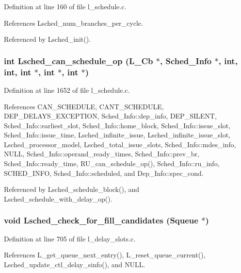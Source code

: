 Definition at line 160 of file l\_\-schedule.c.

References Lsched\_\-num\_\-branches\_\-per\_\-cycle.

Referenced by Lsched\_\-init().
\subsubsection{\setlength{\rightskip}{0pt plus 5cm}int Lsched\_\-can\_\-schedule\_\-op (L\_\-Cb $\ast$, \bf{Sched\_\-Info} $\ast$, int, int, int $\ast$, int $\ast$, int $\ast$)}\label{l__schedule_8h_96359c2354c002d34b4f5804322979dd}




Definition at line 1652 of file l\_\-schedule.c.

References CAN\_\-SCHEDULE, CANT\_\-SCHEDULE, DEP\_\-DELAYS\_\-EXCEPTION, Sched\_\-Info::dep\_\-info, DEP\_\-SILENT, Sched\_\-Info::earliest\_\-slot, Sched\_\-Info::home\_\-block, Sched\_\-Info::issue\_\-slot, Sched\_\-Info::issue\_\-time, Lsched\_\-infinite\_\-issue, Lsched\_\-infinite\_\-issue\_\-slot, Lsched\_\-processor\_\-model, Lsched\_\-total\_\-issue\_\-slots, Sched\_\-Info::mdes\_\-info, NULL, Sched\_\-Info::operand\_\-ready\_\-times, Sched\_\-Info::prev\_\-br, Sched\_\-Info::ready\_\-time, RU\_\-can\_\-schedule\_\-op(), Sched\_\-Info::ru\_\-info, SCHED\_\-INFO, Sched\_\-Info::scheduled, and Dep\_\-Info::spec\_\-cond.

Referenced by Lsched\_\-schedule\_\-block(), and Lsched\_\-schedule\_\-with\_\-delay\_\-op().
\subsubsection{\setlength{\rightskip}{0pt plus 5cm}void Lsched\_\-check\_\-for\_\-fill\_\-candidates (\bf{Squeue} $\ast$)}\label{l__schedule_8h_703cb754b90b99c53efb631cf3a47444}




Definition at line 705 of file l\_\-delay\_\-slots.c.

References L\_\-get\_\-queue\_\-next\_\-entry(), L\_\-reset\_\-queue\_\-current(), Lsched\_\-update\_\-ctl\_\-delay\_\-sinfo(), and NULL.

